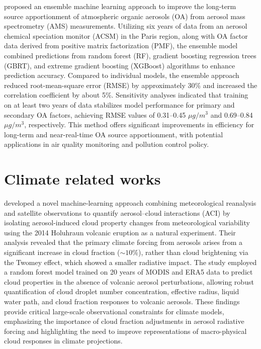 \documentclass[11pt]{article}
\begin{document}
\citet{zhang2025ensemble} proposed an ensemble machine learning approach to improve the long-term source apportionment of atmospheric organic aerosols (OA) from aerosol mass spectrometry (AMS) measurements. Utilizing six years of data from an aerosol chemical speciation monitor (ACSM) in the Paris region, along with OA factor data derived from positive matrix factorization (PMF), the ensemble model combined predictions from random forest (RF), gradient boosting regression trees (GBRT), and extreme gradient boosting (XGBoost) algorithms to enhance prediction accuracy. Compared to individual models, the ensemble approach reduced root-mean-square error (RMSE) by approximately 30\% and increased the correlation coefficient by about 5\%. Sensitivity analyses indicated that training on at least two years of data stabilizes model performance for primary and secondary OA factors, achieving RMSE values of 0.31–0.45 \(\mu g/m^{3}\) and 0.69–0.84 \(\mu g/m^{3}\), respectively. This method offers significant improvements in efficiency for long-term and near-real-time OA source apportionment, with potential applications in air quality monitoring and pollution control policy.

\section{Climate related works}
\citet{chen2022machine} developed a novel machine-learning approach combining meteorological reanalysis and satellite observations to quantify aerosol–cloud interactions (ACI) by isolating aerosol-induced cloud property changes from meteorological variability using the 2014 Holuhraun volcanic eruption as a natural experiment. Their analysis revealed that the primary climate forcing from aerosols arises from a significant increase in cloud fraction (\(\sim 10\%\)), rather than cloud brightening via the Twomey effect, which showed a smaller radiative impact. The study employed a random forest model trained on 20 years of MODIS and ERA5 data to predict cloud properties in the absence of volcanic aerosol perturbations, allowing robust quantification of cloud droplet number concentration, effective radius, liquid water path, and cloud fraction responses to volcanic aerosols. These findings provide critical large-scale observational constraints for climate models, emphasizing the importance of cloud fraction adjustments in aerosol radiative forcing and highlighting the need to improve representations of macro-physical cloud responses in climate projections.
\end{document}
